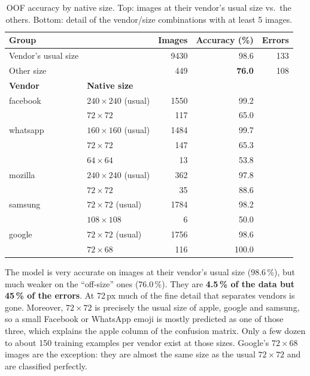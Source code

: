 \documentclass[11pt,a4paper]{article}
\newcommand{\vendor}[1]{\textsf{#1}}
\newcommand{\up}[1]{\textcolor{good}{#1}}
\newcommand{\down}[1]{\textcolor{bad}{#1}}
\begin{document}
\begin{table}[H]
\centering\small
\caption{OOF accuracy by native size. Top: images at their vendor's usual size vs.\ the others. Bottom:
detail of the vendor/size combinations with at least 5 images.}
\label{tab:offsize}
\begin{tabular}{l l r r r}
\toprule
\textbf{Group} & & \textbf{Images} & \textbf{Accuracy (\%)} & \textbf{Errors} \\
\midrule
Vendor's usual size & & 9430 & 98.6 & 133 \\
Other size          & & 449  & \textbf{76.0} & 108 \\
\midrule
\textbf{Vendor} & \textbf{Native size} & & & \\
\vendor{facebook} & $240\times240$ (usual) & 1550 & 99.2 & \\
                  & $72\times72$           & 117  & \down{65.0} & \\
\vendor{whatsapp} & $160\times160$ (usual) & 1484 & 99.7 & \\
                  & $72\times72$           & 147  & \down{65.3} & \\
                  & $64\times64$           & 13   & \down{53.8} & \\
\vendor{mozilla}  & $240\times240$ (usual) & 362  & 97.8 & \\
                  & $72\times72$           & 35   & \down{88.6} & \\
\vendor{samsung}  & $72\times72$ (usual)   & 1784 & 98.2 & \\
                  & $108\times108$         & 6    & \down{50.0} & \\
\vendor{google}   & $72\times72$ (usual)   & 1756 & 98.6 & \\
                  & $72\times68$           & 116  & \up{100.0} & \\
\bottomrule
\end{tabular}
\end{table}

The model is very accurate on images at their vendor's usual size (98.6\,\%), but much weaker on the
``off-size'' ones (76.0\,\%). They are \textbf{4.5\,\% of the data but 45\,\% of the errors}. At 72\,px much
of the fine detail that separates vendors is gone. Moreover, $72\times72$ is precisely the usual size of
\vendor{apple}, \vendor{google} and \vendor{samsung}, so a small Facebook or WhatsApp emoji is mostly
predicted as one of those three, which explains the \vendor{apple} column of the confusion matrix. Only a
few dozen to about 150 training examples per vendor exist at those sizes. Google's $72\times68$ images
are the exception: they are almost the same size as the usual $72\times72$ and are classified perfectly.
\end{document}
